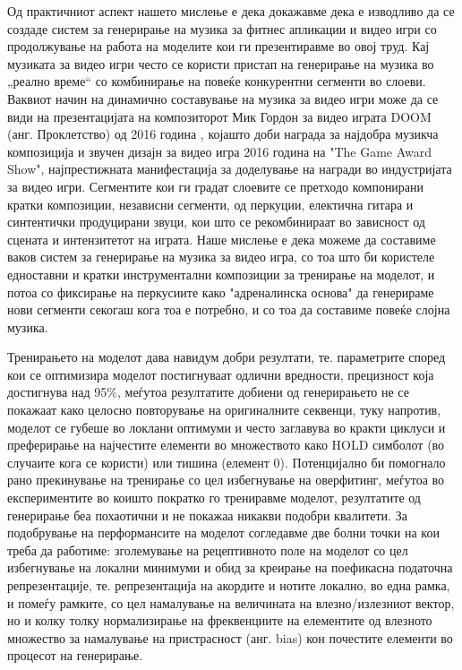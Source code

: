 Од практичниот аспект нашето мислење е дека докажавме дека е изводливо да се создаде систем за генерирање на музика за фитнес апликации и видео игри со продолжување на работа на моделите кои ги презентиравме во овој труд. Кај музиката за видео игри често се користи пристап на генерирање на музика во „реално време“ со комбинирање на повеќе конкурентни сегменти во слоеви. Ваквиот начин на динамично составување на музика за видео игри може да се види на презентацијата на композиторот Мик Гордон за видео играта DOOM (анг. Проклетство) од 2016 година \cite{Gordon2017}, којашто доби награда за најдобра музикча композиција и звучен дизајн за видео игра 2016 година на "The Game Award Show", најпрестижната манифестација за доделување на награди во индустријата за видео игри. Сегментите кои ги градат слоевите се претходо компонирани кратки композиции, независни сегменти, од перкуции, електична гитара и синтентички продуцирани звуци, кои што се рекомбинираат во зависност од сцената и интензитетот на играта. Наше мислење е дека можеме да составиме ваков систем за генерирање на музика за видео игра, со тоа што би користеле едноставни и кратки инструментални композиции за тренирање на моделот, и потоа со фиксирање на перкусиите како "адреналинска основа" да генерираме нови сегменти секогаш кога тоа е потребно, и со тоа да составиме повеќе слојна музика. 

Тренирањето на моделот дава навидум добри резултати, те. параметрите според кои се оптимизира моделот постигнуваат одлични вредности, прецизност која достигнува над 95\%, меѓутоа резултатите добиени од генерирањето не се покажаат како целосно повторување на оригиналните секвенци, туку напротив, моделот се губеше во локлани оптимуми и често заглавува во кракти циклуси и преферирање на најчестите елементи во множеството како HOLD симболот (во случаите кога се користи) или тишина (елемент 0). Потенцијално би помогнало рано прекинување на тренирање со цел избегнување на оверфитинг, меѓутоа во експериментите во коишто пократко го трениравме моделот, резултатите од генерирање беа похаотични и не покажаа никакви подобри квалитети. За подобрување на перформансите на моделот согледавме две болни точки на кои треба да работиме: зголемување на рецептивното поле на моделот со цел избегнување на локални минимуми и обид за креирање на поефикасна податочна репрезентације, те. репрезентација на акордите и нотите локално, во една рамка, и помеѓу рамките, со цел намалување на величината на влезно/излезниот вектор, но и колку толку нормализирање на фреквенциите на елементите од влезното множество за намалување на пристрасност (анг. bias) кон почестите елементи во процесот на генерирање.

